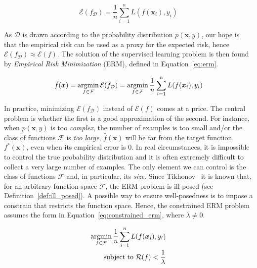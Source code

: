 \begin{equation} \label{eq:empirical_risk}
	\mathcal{E}(f_{\mathcal{D}}) = \frac{1}{n} \sum_{i=1}^{n} L(f(\bm{x}_i), y_i)
\end{equation}

As $\mathcal{D}$ is drawn according to the probability distribution $p(\bm{x},y)$, our hope is that the empirical risk can be used as a proxy for the expected risk, hence $\mathcal{E}(f_{\mathcal{D}}) \approx \mathcal{E}(f)$. The solution of the supervised learning problem is then found by \textit{Empirical Risk Minimization} (ERM), defined in Equation~\eqref{eq:erm}.

\begin{equation} \label{eq:erm}
	\hat f(\bm{x}) = \mathop{\mathrm{argmin}}\limits_{f \in \mathcal{F}}{\mathcal{E}(f_{\mathcal{D}})} = \mathop{\mathrm{argmin}}\limits_{f \in \mathcal{F}}{\frac{1}{n} \sum_{i=1}^{n} L(f(\bm{x}_i), y_i)}
\end{equation}

In practice, minimizing $\mathcal{E}(f_{\mathcal{D}})$ instead of $\mathcal{E}(f)$ comes at a price. The central problem is whether the first is a good approximation of the second. For instance, when $p(\bm{x}, y)$ is too \textit{complex}, the number of examples is too small and/or the class of functions $\mathcal{F}$ is \textit{too large}, $\hat f(\bm{x})$ will be far from the target function $f^*(\bm{x})$, even when its empirical error is $0$. In real circumstances, it is impossible to control the true probability distribution and it is often extremely difficult to collect a very large number of examples. The only element we can control is the class of functions $\mathcal{F}$ and, in particular, its \textit{size}. Since Tikhonov~\cite{tikhonov1963solution} it is known that, for an arbitrary function space $\mathcal{F}$, the ERM problem is ill-posed (see Definition~\ref{def:ill_posed}). A possible way to ensure well-posedness is to impose a constrain that restricts the function space. Hence, the constrained ERM problem assumes the form in Equation~\eqref{eq:constrained_erm}, where $\lambda \neq 0$.

\begin{equation} \label{eq:constrained_erm}
	\begin{aligned}
		\mathop{\mathrm{argmin}}\limits_{f \in \mathcal{F}}{\frac{1}{n} \sum_{i=1}^{n} L(f(\bm{x}_i), y_i)} \\
		\text{subject to}~\mathcal{R}(f) < \frac{1}{\lambda}
	\end{aligned}
\end{equation}

